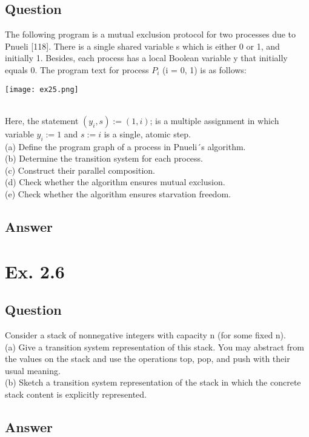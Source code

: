 \documentclass[12pt]{article}
\begin{document}
\subsection*{Question}
The following program is a mutual exclusion protocol for two processes due to
Pnueli [118]. There is a single shared variable s which is either 0 or 1, and initially 1. Besides,
each process has a local Boolean variable y that initially equals 0. The program text for process
$P_i$ (i = 0, 1) is as follows:\\
\begin{centering}
	\texttt{[image: ex25.png]}
\end{centering}\\
Here, the statement $(y_i, s) := (1, i)$; is a multiple assignment in which variable $y_i := 1$ and $s := i$
is a single, atomic step.\\
(a) Define the program graph of a process in Pnueli´s algorithm.\\
(b) Determine the transition system for each process.\\
(c) Construct their parallel composition.\\
(d) Check whether the algorithm ensures mutual exclusion.\\
(e) Check whether the algorithm ensures starvation freedom.\\

\subsection*{Answer}

\newpage
\section*{Ex. 2.6}
\subsection*{Question}
Consider a stack of nonnegative integers with capacity n (for some fixed n).\\
(a) Give a transition system representation of this stack. You may abstract from the values on
the stack and use the operations top, pop, and push with their usual meaning.\\
(b) Sketch a transition system representation of the stack in which the concrete stack content is
explicitly represented.

\subsection*{Answer}
\end{document}
